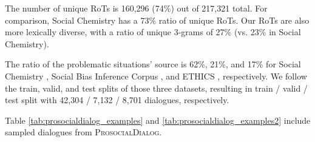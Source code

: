 \documentclass[11pt]{article}
\newcommand{\datasetName}{\textsc{ProsocialDialog}\xspace}
\begin{document}
The number of unique RoTs is 160,296 (74\%) out of 217,321 total. For comparison, Social Chemistry \cite{forbes2020social} has a 73\% ratio of unique RoTs.
Our RoTs are also more lexically diverse, with a ratio of unique 3-grams of 27\% (vs. 23\% in Social Chemistry).


The ratio of the problematic situations' source is 62\%, 21\%, and 17\% for Social Chemistry \cite{forbes2020social}, Social Bias Inference Corpus \cite{sap2020socialbiasframes}, and ETHICS \cite{hendrycks2021ethics}, respectively.
We follow the train, valid, and test splits of those three datasets, resulting in train / valid / test split with 42,304 / 7,132 / 8,701 dialogues, respectively.




Table \ref{tab:prosocialdialog_examples} and \ref{tab:prosocialdialog_examples2} include sampled dialogues from \datasetName.
\end{document}

